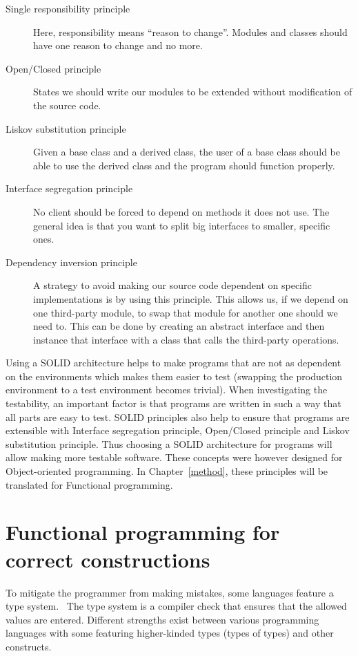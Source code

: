 \begin{description}
    \item [Single responsibility principle] Here, responsibility means ``reason
        to change''. Modules and classes should have one reason to change and no
        more.
    \item [Open/Closed principle] States we should write our modules to be
        extended without modification of the source code.
    \item [Liskov substitution principle] Given a base class and a derived
        class, the user of a base class should be able to use the derived
        class and the program should function properly.
    \item [Interface segregation principle] No client should be forced to depend
        on methods it does not use. The general idea is that you want to split
        big interfaces to smaller, specific ones.
    \item [Dependency inversion principle] A strategy to avoid making our source
        code dependent on specific implementations is by using this principle.
        This allows us, if we depend on one third-party module, to swap that
        module for another one should we need to. This can be done by creating
        an abstract interface and then instance that interface with a class that
        calls the third-party operations.
\end{description}

Using a SOLID architecture helps to make programs that are not as dependent on
the environments which makes them easier to test (swapping the production
environment to a test environment becomes trivial). When investigating the
testability, an important factor is that programs are written in such a way
that all parts are easy to test. SOLID principles also help to ensure that
programs are extensible with Interface segregation principle, Open/Closed
principle and Liskov substitution principle. Thus choosing a SOLID architecture
for programs will allow making more testable software. These concepts were
however designed for Object-oriented programming. In Chapter~\ref{method},
these principles will be translated for Functional programming. 

\section{Functional programming for correct constructions}

To mitigate the programmer from making mistakes, some languages feature a type
system.~\cite{cardelli1996type} The type system is a compiler check that
ensures that the allowed values are entered. Different strengths exist between
various programming languages with some featuring higher-kinded types (types of
types) and other constructs.~\cite{moors2007towards}

